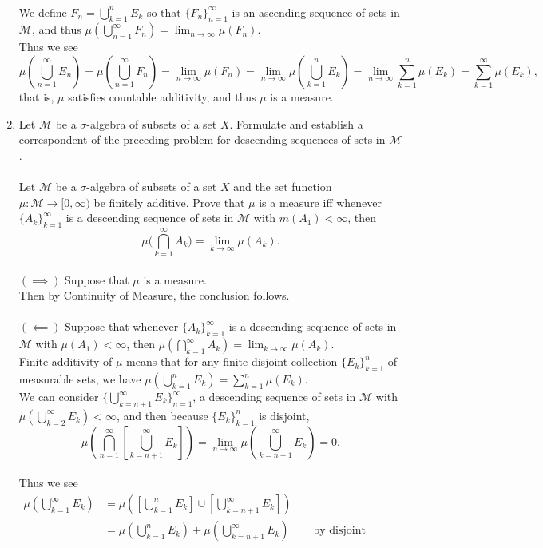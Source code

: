 \begin{enumerate}
	\\We define $F_n=\bigcup_{k=1}^n E_k$ so that $\{F_n\}_{n=1}^\infty$ is an ascending sequence of sets in $\mathcal{M}$, and thus $\mu ( \bigcup_{n=1}^\infty F_n ) = \lim_{n \to \infty} \mu(F_n)$.
	\\Thus we see
	\[
		\mu(\bigcup_{n=1}^\infty E_n)=\mu(\bigcup_{n=1}^\infty F_n)=\lim_{n \to \infty} \mu(F_n)=\lim_{n \to \infty} \mu(\bigcup_{k=1}^n E_k)=\lim_{n \to \infty}\sum_{k=1}^n\mu(E_k)=\sum_{k=1}^\infty\mu(E_k),
	\]
	that is, $\mu$ satisfies countable additivity, and thus $\mu$ is a measure.
	\item Let $\mathcal{M}$ be a $\sigma$-algebra of subsets of a set $X$. Formulate and establish a correspondent of the preceding problem for descending sequences of sets in $\mathcal{M}$.\\
	\\Let $\mathcal{M}$ be a $\sigma$-algebra of subsets of a set $X$ and the set function $\mu : \mathcal{M} \to [0,\infty)$ be finitely additive.
	Prove that $\mu$ is a measure iff whenever $\{A_k\}_{k=1}^\infty$ is a descending sequence of sets in $\mathcal{M}$ with $m(A_1)<\infty$, then
	\[
	\mu \biggl ( \bigcap_{k=1}^\infty A_k \biggr ) = \lim_{k \to \infty} \mu(A_k).	
	\]
	\\$(\implies)$ Suppose that $\mu$ is a measure.\\
	Then by Continuity of Measure, the conclusion follows.\\
	\\$(\impliedby)$ Suppose that whenever $\{A_k\}_{k=1}^\infty$ is a descending sequence of sets in $\mathcal{M}$ with $\mu(A_1)<\infty$, then $\mu ( \bigcap_{k=1}^\infty A_k ) = \lim_{k \to \infty} \mu(A_k)$.\\
	Finite additivity of $\mu$ means that for any finite disjoint collection $\{E_k\}_{k=1}^n$ of measurable sets, we have $\mu(\bigcup_{k=1}^n E_k)=\sum_{k=1}^n\mu(E_k)$.
	\\We can consider $\{\bigcup_{k={n+1}}^\infty E_k\}_{n=1}^\infty$, a descending sequence of sets in $\mathcal{M}$ with $\mu(\bigcup_{k=2}^\infty E_k)<\infty$, and then because $\{E_k\}_{k=1}^n$ is disjoint,
	\[
		\mu ( \bigcap_{n=1}^\infty [\bigcup_{k={n+1}}^\infty E_k]) = \lim_{n \to \infty} \mu(\bigcup_{k={n+1}}^\infty E_k)=0.
	\]
	\\Thus we see
	\begin{align*}
		\mu(\bigcup_{k=1}^\infty E_k)&=\mu([\bigcup_{k=1}^n E_k]\cup[\bigcup_{k={n+1}}^\infty E_k])\\
		&=\mu(\bigcup_{k=1}^n E_k)+\mu(\bigcup_{k={n+1}}^\infty E_k)&&\text{ by disjoint additivity}\\

\end{align*}
\end{enumerate}
